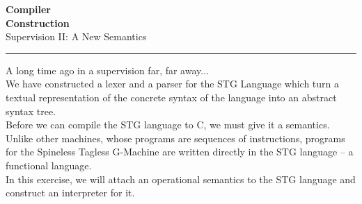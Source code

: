 \documentclass[10pt,a4paper]{exam} %
\begin{document}
\newcommand{\course}{Compiler\\[-0.4cm]Construction}
\newcommand{\week}{II}

\everymath{\color{campurpledark}}
\everydisplay{\color{campurpledark}}




\marksnotpoints
\pointsdroppedatright
\marksnotpoints
\marginpointname{ \points}

\begin{center}
\LARGE {\textbf{\color{campurpledark} \course} }\\[-0.1cm]
\Large \color{campurpledark} Supervision \week: A New Semantics\\
\end{center}

{\color{campurple}\hrule}

\newcommand{\metavar}[1]{{\color{campurple}#1}}

\vspace{0.5cm}

\newcommand{\terminal}[1]{\texttt{\color{campurple}#1}}
\newcommand{\bl}[1]{{\color{black}#1}}

\begin{center}
\parbox[c]{300pt}{
A long time ago in a supervision far, far away... \\

We have constructed a lexer and a parser for the {STG Language} which turn a textual representation of the concrete syntax of the language into an abstract syntax tree. \\

Before we can compile the STG language to C, we must give it a semantics. Unlike other machines, whose programs are sequences of instructions, programs for the Spineless Tagless G-Machine are written directly in the STG language -- a functional language. \\

In this exercise, we will attach an operational semantics to the STG language and construct an interpreter for it. 
}
\end{center}
\end{document}

